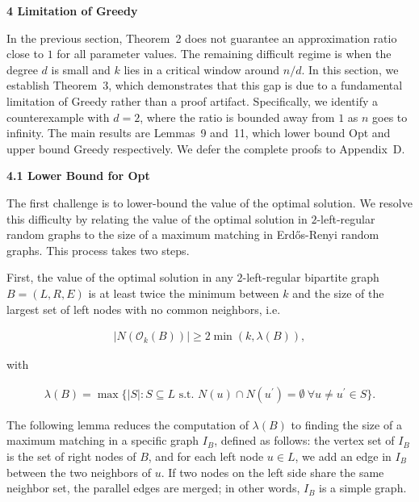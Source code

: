 \par\medskip\noindent\textbf{4 Limitation of Greedy}\par




In the previous section, Theorem 2 does not guarantee an approximation ratio close to $1$ for all parameter values. The remaining difficult regime is when the degree $d$ is small and $k$ lies in a critical window around $n/d$.
In this section, we establish Theorem 3, which demonstrates that this gap is due to a fundamental limitation of Greedy rather than a proof artifact.
Specifically, we identify a counterexample with $d=2$, where the ratio is bounded away from $1$ as $n$ goes to infinity.
The main results are Lemmas 9 and 11, which lower bound Opt and upper bound Greedy respectively.
We defer the complete proofs to Appendix D.\par




\par\medskip\noindent\textbf{4.1 Lower Bound for Opt}\par




The first challenge is to lower-bound the value of the optimal solution.
We resolve this difficulty by relating the value of the optimal solution in $2$-left-regular random graphs to the size of a maximum matching in Erdős-Renyi random graphs.
This process takes two steps.\par




First, the value of the optimal solution in any $2$-left-regular bipartite graph $B=(L,R,E)$ is at least twice the minimum between $k$ and the size of the largest set of left nodes with no common neighbors, i.e.\par


\[\begin{gathered}
\displaystyle|N(\mathcal{O}_{k}(B))|\geq 2\min\left(k,\lambda(B)\right),
\end{gathered}\]


with\par


\[\begin{gathered}
\displaystyle\lambda(B)=\max\{|S|:S\subseteq L\text{ s.t. }N(u)\cap N(u^{\prime})=\emptyset\ \forall u\neq u^{\prime}\in S\}.
\end{gathered}\]




The following lemma reduces the computation of $\lambda(B)$ to finding the size of a maximum matching in a specific graph $I_{B}$, defined as follows: the vertex set of $I_{B}$ is the set of right nodes of $B$, and for each left node $u\in L$, we add an edge in $I_{B}$ between the two neighbors of $u$. If two nodes on the left side share the same neighbor set, the parallel edges are merged; in other words, $I_{B}$ is a simple graph.\par



